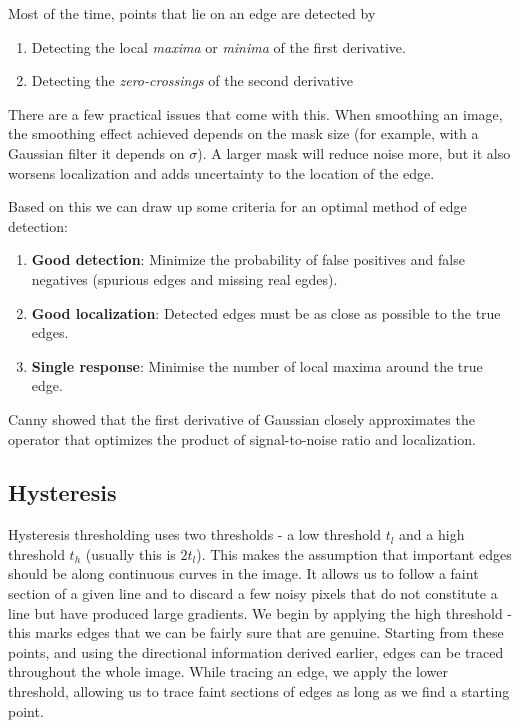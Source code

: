 \documentclass{article}
\begin{document}
	\par
	Most of the time, points that lie on an edge are detected by 
		\begin{enumerate}
			\item Detecting the local \textit{maxima} or \textit{minima} of the first derivative.
			\item Detecting the \textit{zero-crossings} of the second derivative
		\end{enumerate}
		
	There are a few practical issues that come with this. When smoothing an image, the smoothing effect achieved depends on the mask size (for example, with a Gaussian filter it depends on $\sigma$). A larger mask will reduce noise more, but it also worsens localization and adds uncertainty to the location of the edge.
	
	Based on this we can draw up some criteria for an optimal method of edge detection:
	\begin{enumerate}
		\item \textbf{Good detection}: Minimize the probability of false positives and false negatives (spurious edges and missing real egdes).
		\item \textbf{Good localization}: Detected edges must be as close as possible to the true edges.
		\item \textbf{Single response}: Minimise the number of local maxima around the true edge.
	\end{enumerate}

	Canny showed that the first derivative of Gaussian closely approximates the operator that optimizes the product of signal-to-noise ratio and localization.

	\subsection{Hysteresis}
	Hysteresis thresholding uses two thresholds - a low threshold $t_{l}$ and a high threshold $t_{h}$ (usually this is $2t_{l}$). This makes the assumption that important edges should be along continuous curves in the image. It allows us to follow a faint section of a given line and to discard a few noisy pixels that do not constitute a line but have produced large gradients. We begin by applying the high threshold - this marks edges that we can be fairly sure that are genuine. Starting from these points, and using the directional information derived earlier, edges can be traced throughout the whole image. While tracing an edge, we apply the lower threshold, allowing us to trace faint sections of edges as long as we find a starting point. 
\end{document}
